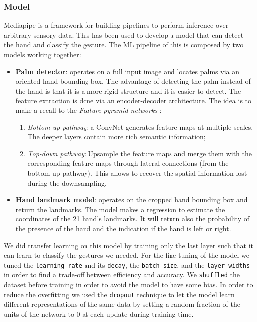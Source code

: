 \documentclass[10pt,twocolumn,letterpaper]{article}
\begin{document}
\subsubsection{Model}
Mediapipe is a framework for building pipelines to perform inference over arbitrary sensory data. This has been used to develop a model that can detect the hand and classify the gesture.
The ML pipeline of this is composed by two models working together:
\begin{itemize}
   \item \textbf{Palm detector}: operates on a full input image and locates palms via an oriented hand bounding box. The advantage of detecting the palm instead of the hand 
   is that it is a more rigid structure and it is easier to detect. The feature extraction is done via an encoder-decoder architecture. The idea is to make a recall to the 
   \textit{Feature pyramid networks} \cite{lin2017featurepyramidnetworksobject}:
   \begin{enumerate}
      \item \textit{Bottom-up pathway}: a ConvNet generates feature maps at multiple scales. The deeper layers contain more rich semantic information;
      \item \textit{Top-down pathway}: Upsample the feature maps and merge them with the corresponding feature maps through lateral connections (from the bottom-up pathway).
      This allows to recover the spatial information lost during the downsampling.
   \end{enumerate}
   \item \textbf{Hand landmark model}: operates on the cropped hand bounding box and return the landmarks. 
   The model makes a regression to estimate the coordinates of the 21 hand's landmarks. It will return also the probability of the presence of the hand and 
   the indication if the hand is left or right.
\end{itemize}
We did transfer learning on this model by training only the last layer such that it can learn to classify the gestures we needed.
For the fine-tuning of the model we tuned the \texttt{learning\_rate} and its \texttt{decay}, 
the \texttt{batch\_size}, and the \texttt{layer\_widths} in order to find a trade-off between 
efficiency and accuracy.
We \texttt{shuffled} the dataset before training in order to avoid the model to have some bias.
In order to reduce the overfitting we used the \texttt{dropout} technique to 
let the model learn different representations of the same data by setting a random fraction of 
the units of the network to 0 at each update during training time.
\end{document}
